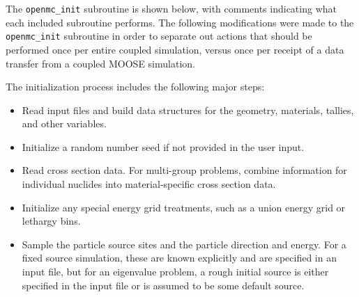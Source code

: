 \documentclass[10pt]{article}
\numberwithin{equation}{section} %
\begin{document}
The {\tt openmc\_init} subroutine is shown below, with comments indicating what each included subroutine performs. The following modifications were made to the {\tt openmc\_init} subroutine in order to separate out actions that should be performed once per entire coupled simulation, versus once per receipt of a data transfer from a coupled MOOSE simulation. 

The initialization process includes the following major steps:

\begin{itemize}
\item Read input files and build data structures for the geometry, materials, tallies, and other variables.
\item Initialize a random number seed if not provided in the user input.
\item Read cross section data. For multi-group problems, combine information for individual nuclides into material-specific cross section data. 
\item Initialize any special energy grid treatments, such as a union energy grid or lethargy bins. 
\item Sample the particle source sites and the particle direction and energy. For a fixed source simulation, these are known explicitly and are specified in an input file, but for an eigenvalue problem, a rough initial source is either specified in the input file or is assumed to be some default source. 
\end{itemize}
\end{document}
